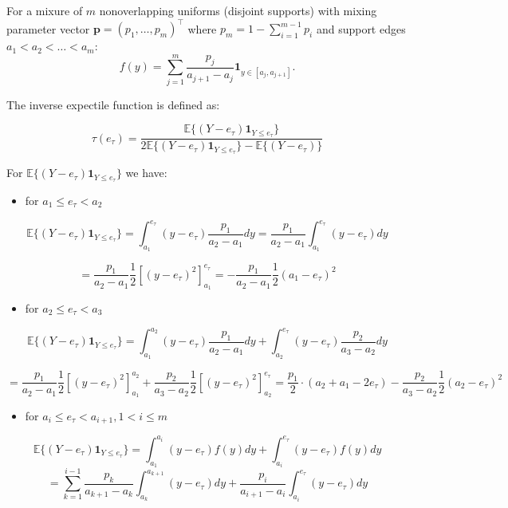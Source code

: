 \documentclass[
]{article}
\providecommand{\tightlist}{%
  \setlength{\itemsep}{0pt}\setlength{\parskip}{0pt}}
\theoremstyle{definition}
\theoremstyle{definition}
\theoremstyle{definition}
\theoremstyle{definition}
\theoremstyle{remark}
\begin{document}
For a mixure of \(m\) nonoverlapping uniforms (disjoint supports) with mixing parameter vector \(\mathbf p=(p_1,\ldots,p_m)^\top\) where \(p_m=1-\sum_{i=1}^{m-1}p_i\) and support edges \(a_1<a_2<\ldots<a_m\):
\[f(y)=\sum_{j=1}^m\frac{p_j}{a_{j+1}-a_j}\mathbf 1_{y\in [a_j,a_{j+1}]}.\]

The inverse expectile function is defined as:

\begin{equation}\tau(e_\tau) = \frac{\mathbb E\{(Y-e_\tau)\mathbf 1_{Y\leq e_\tau}\}}  {2\mathbb E\{(Y-e_\tau)\mathbf 1_{Y\leq e_\tau}\} - \mathbb E\{(Y-e_\tau)\}}\end{equation}

For \(\mathbb E\{(Y-e_\tau)\mathbf 1_{Y\leq e_\tau}\}\) we have:

\begin{itemize}
\tightlist
\item
  for \(a_1\leq e_\tau< a_2\)
\end{itemize}

\[\mathbb E\{(Y-e_\tau)\mathbf 1_{Y\leq e_\tau}\} = \int_{a_1}^{e_\tau}(y-e_\tau)\frac{p_1}{a_2-a_1}dy = \frac{p_1}{a_2-a_1}\int_{a_1}^{e_\tau}(y-e_\tau)dy\]

\[ = \frac{p_1}{a_2-a_1}\frac 12[(y-e_\tau)^2]_{a_1}^{e_\tau} = -\frac{p_1}{a_2-a_1}\frac 12 (a_1-e_\tau)^2\]

\begin{itemize}
\tightlist
\item
  for \(a_2\leq e_\tau< a_3\)
\end{itemize}

\[\mathbb E\{(Y-e_\tau)\mathbf 1_{Y\leq e_\tau}\} = \int_{a_1}^{a_2}(y-e_\tau)\frac{p_1}{a_2-a_1}dy + \int_{a_2}^{e_\tau}(y-e_\tau)\frac{p_2}{a_3-a_2}dy\]

\[ = \frac{p_1}{a_2-a_1}\frac 12[(y-e_\tau)^2]_{a_1}^{a_2} + \frac{p_2}{a_3-a_2}\frac 12[(y-e_\tau)^2]_{a_2}^{e_\tau} =\frac{p_1}2\cdot (a_2+a_1-2e_\tau) -\frac{p_2}{a_3-a_2}\frac 12 (a_2-e_\tau)^2\]

\begin{itemize}
\tightlist
\item
  for \(a_i\leq e_\tau< a_{i+1}, 1<i\leq m\)
\end{itemize}

\[\mathbb E\{(Y-e_\tau)\mathbf 1_{Y\leq e_\tau}\} =\int_{a_1}^{a_{i}}(y-e_\tau)f(y)dy +  \int_{a_i}^{e_\tau}(y-e_\tau)f(y)dy\]
\[=\sum_{k=1}^{i-1}\frac{p_k}{a_{k+1}-a_k}\int_{a_k}^{a_{k+1}}(y-e_\tau)dy + \frac{p_i}{a_{i+1}-a_i} \int_{a_i}^{e_\tau}(y-e_\tau)dy\]
\end{document}
